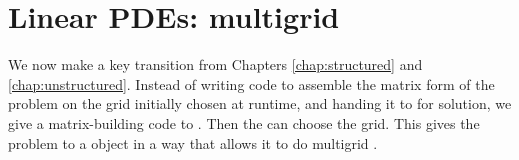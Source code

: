 
\chapter{Linear PDEs: multigrid}
\label{chap:multigrid}

We now make a key transition from Chapters \ref{chap:structured} and \ref{chap:unstructured}.  Instead of writing code to assemble the matrix form of the problem on the grid initially chosen at runtime, and handing it to \pKSP for solution, we give a matrix-building code to \pKSP.  Then the \pKSP can choose the grid.  This gives the problem to a \PETSc \pKSP object in a way that allows it to do multigrid \citep{Briggsetal2000}.



